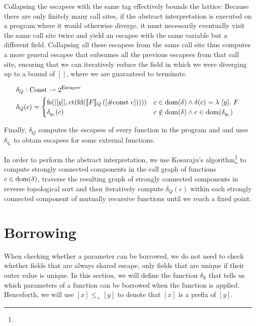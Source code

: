 Collapsing the escapees with the same tag effectively bounds the lattice: Because there are only finitely many call sites, if the abstract interpretation is executed on a program where it would otherwise diverge, it must necessarily eventually visit the same call site twice and yield an escapee with the same variable but a different field. Collapsing all these escapees from the same call site thus computes a more general escapee that subsumes all the previous escapees from that call site, ensuring that we can iteratively reduce the field in which we were diverging up to a bound of $[]$, where we are guaranteed to terminate.

\begin{align*}
	\delta_Q &: \mathrlap{\Const \rightharpoonup 2^{\Escapee}} \\
	\delta_Q&(c) = \begin{cases}
		\fs(|[y]|, \ct(\fd(\ecp{F}{[\#\text{const c}]}))) & c \in \dom(\delta) \land \delta(c) = \lambda\ [y].\ F \\
		\delta_{q_e}(c) & c \notin \dom(\delta) \land c \in \dom(\delta_{q_e})
	\end{cases}
\end{align*}

Finally, $\delta_Q$ computes the escapees of every function in the program and and uses $\delta_{q_e}$ to obtain escapees for some external functions.

In order to perform the abstract interpretation, we use Kosaraju's algorithm\footnote{} to compute strongly connected components in the call graph of functions $c \in \mathrm{dom}(\delta)$, traverse the resulting graph of strongly connected components in reverse topological sort and then iteratively compute $\delta_Q(c)$ within each strongly connected component of mutually recursive functions until we reach a fixed point.

\section{Borrowing}\label{sec:borrowing}
When checking whether a parameter can be borrowed, we do not need to check whether fields that are always shared escape, only fields that are unique if their outer value is unique. In this section, we will define the function $\delta_\mathbb{B}$ that tells us which parameters of a function can be borrowed when the function is applied. Henceforth, we will use $[x] \leq_+ [y]$ to denote that $[x]$ is a prefix of $[y]$.

